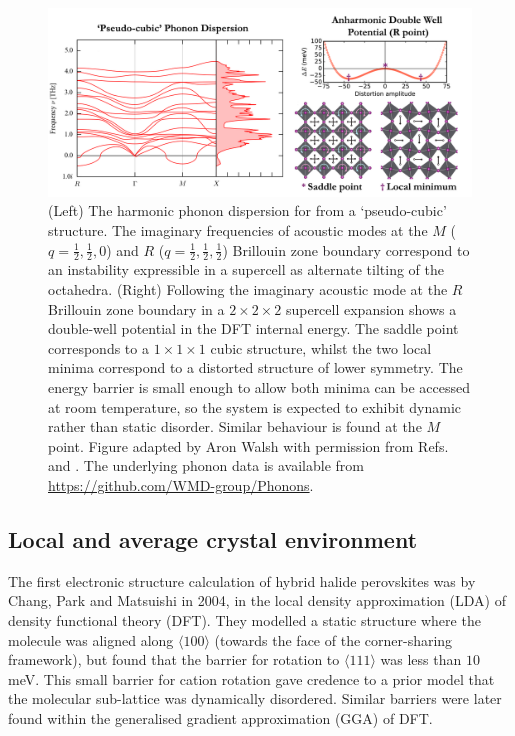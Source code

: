 \begin{figure}
\includegraphics[width=1.0\columnwidth]{./figures/ch2/f2.png}
\caption[ phonon dispersion and double-well potential energy surface]{
    (Left) The harmonic phonon dispersion for  from a `pseudo-cubic' structure. 
    The imaginary frequencies of acoustic modes at the $M$ ($q=\frac{1}{2},\frac{1}{2},0$) and $R$ ($q = \frac{1}{2}, \frac{1}{2}, \frac{1}{2}$) Brillouin zone boundary correspond to an instability expressible in a supercell as alternate tilting of the octahedra.
    (Right) Following the imaginary acoustic mode at the $R$ Brillouin zone boundary in a $2\times2\times2$ supercell expansion shows a double-well potential in the DFT internal energy. 
    The saddle point corresponds to a $1\times1\times1$ cubic structure, whilst the two local minima correspond to a distorted structure of lower symmetry. 
The energy barrier is small enough to allow both minima can be accessed at room temperature, so the system is expected to exhibit dynamic rather than static disorder. 
Similar behaviour is found at the $M$ point. 
Figure adapted by Aron Walsh with permission from Refs. \autocite{Whalley2016} and \autocite{Beecher2016a}.
The underlying phonon data is available from \url{https://github.com/WMD-group/Phonons}.
}
\label{fig2}
\end{figure}

\subsection{Local and average crystal environment} \label{localaverage}

The first electronic structure calculation of hybrid halide perovskites was by Chang, Park and Matsuishi in 2004, \autocite{Chang2004}
in the local density approximation (LDA) of density functional theory (DFT).
They modelled a static structure where the  molecule was aligned along $\langle100\rangle$ (towards the face of the corner-sharing  framework), but found that the barrier for rotation to $\langle111\rangle$ was less than $10$ meV. 
This small barrier for cation rotation gave credence to a prior model that the molecular sub-lattice was dynamically disordered.\autocite{Poglitsch1987c}
Similar barriers were later found within the generalised gradient approximation (GGA) of DFT.\autocite{Brivio2013} 

